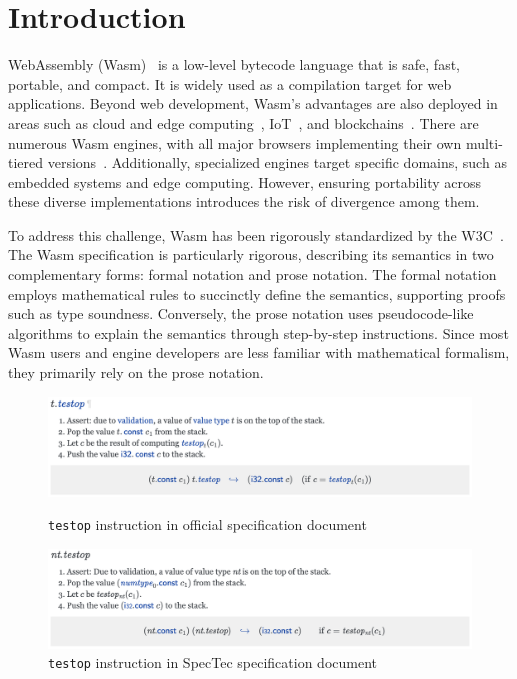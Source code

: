 
\chapter{Introduction}
\label{ch:intro}
\noindent

WebAssembly (Wasm)~\cite{wasm} is a low-level bytecode language that is safe, fast,
portable, and compact.
It is widely used as a compilation target for web applications.
Beyond web development, Wasm's advantages are also deployed in areas such as
cloud and edge computing~\cite{lucet, cloudflare}, IoT~\cite{wasm-iot}, and
blockchains~\cite{wasm-blockchain}.
There are numerous Wasm engines, with all major browsers implementing their own
multi-tiered versions~\cite{v8, spidermonkey, webkit}.
Additionally, specialized engines target specific domains, such as embedded
systems and edge computing.
However, ensuring portability across these diverse implementations introduces
the risk of divergence among them.


To address this challenge, Wasm has been rigorously standardized by the
W3C~\cite{wasm-w3c}.
The Wasm specification is particularly rigorous, describing its semantics in
two complementary forms: formal notation and prose notation.
The formal notation employs mathematical rules to succinctly define the
semantics, supporting proofs such as type soundness.
Conversely, the prose notation uses pseudocode-like algorithms to explain the
semantics through step-by-step instructions.
Since most Wasm users and engine developers are less familiar with mathematical
formalism, they primarily rely on the prose notation.

\begin{figure}[t]
    \centerline{\includegraphics[width=15cm]{fig/testop}}
    \caption[\texttt{testop} instruction in official specification document]
      {\texttt{testop} instruction in official specification document}
      \label{fig:testop}
    \centerline{\includegraphics[width=15cm]{fig/spectec-testop}}
    \caption[\texttt{testop} instruction in SpecTec specification document]
      {\texttt{testop} instruction in SpecTec specification document}
      \label{fig:spectec-testop}
\end{figure}


